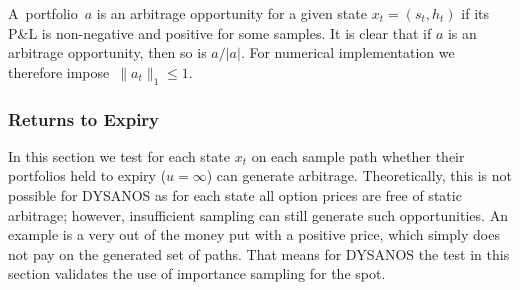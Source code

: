 A~portfolio~$a$ is an arbitrage opportunity for a given state $x_t = (s_t,h_t)$
if its P\&L is non-negative and positive for some samples.
It is clear that if $a$ is an arbitrage opportunity, then so is $a/|a|$. For numerical implementation we therefore impose~$\| a_t \|_1\leq 1$.


\subsubsection{Returns to Expiry}

In this section we test for each state $x_t$ on each sample path
whether their portfolios held to expiry ($u=\infty$) can generate arbitrage. Theoretically, this is not possible for DYSANOS as for each state all option
prices are free of static arbitrage; however, insufficient sampling can still generate such opportunities. An example is a very out of the money
put with a positive price, which simply does not pay on the generated set of paths. That means for DYSANOS the test in this section
validates the use of importance sampling for the spot.

